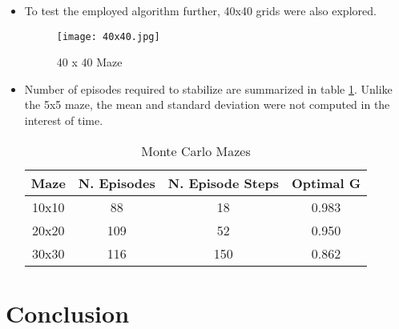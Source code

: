 \documentclass[letterpaper]{article} %
\begin{document}
\begin{itemize}
	    \item To test the employed algorithm further, 40x40 grids were also explored. 

	    \begin{figure}[htbp]
	      \centering
	      \texttt{[image: 40x40.jpg]}
		\caption{40 x 40 Maze}
	      \label{fig:40x40_solution}
	    \end{figure}



	\item Number of episodes required to stabilize are summarized in table \ref{tab:num_episodes}. Unlike the 5x5 maze, the mean and standard deviation were not computed in the interest of time.

	    \begin{table}[htbp]
	    \caption{Monte Carlo Mazes}
	    \label{tab:num_episodes}
	    \centering
	    \begin{tabular}{|c|c|c|c|}
	    \hline
		Maze    &  N. Episodes & N. Episode Steps & Optimal G       \\ \hline
		10x10   & 88        & 18                  & 0.983   \\ \hline
		20x20   & 109       & 52                  & 0.950   \\ \hline
		30x30   & 116       & 150                 & 0.862   \\ \hline
	    \end{tabular}
	    \end{table}
	\end{itemize}

\section{Conclusion}




\end{document}
